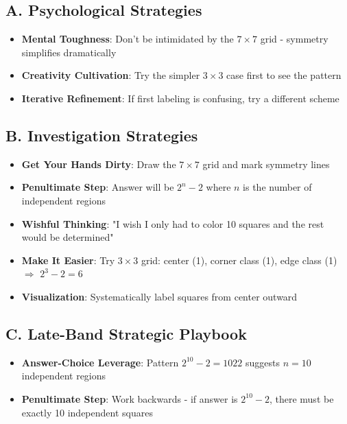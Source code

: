 \documentclass[]{article}
\begin{document}
\begin{strategicbox}
\subsection*{A. Psychological Strategies}
\begin{itemize}[leftmargin=*]
    \item \textbf{Mental Toughness}: Don't be intimidated by the $7 \times 7$ grid - symmetry simplifies dramatically
    \item \textbf{Creativity Cultivation}: Try the simpler $3 \times 3$ case first to see the pattern
    \item \textbf{Iterative Refinement}: If first labeling is confusing, try a different scheme
\end{itemize}

\subsection*{B. Investigation Strategies}
\begin{itemize}[leftmargin=*]
    \item \textbf{Get Your Hands Dirty}: Draw the $7 \times 7$ grid and mark symmetry lines
    \item \textbf{Penultimate Step}: Answer will be $2^n - 2$ where $n$ is the number of independent regions
    \item \textbf{Wishful Thinking}: "I wish I only had to color 10 squares and the rest would be determined"
    \item \textbf{Make It Easier}: Try $3 \times 3$ grid: center (1), corner class (1), edge class (1) $\Rightarrow$ $2^3 - 2 = 6$
    \item \textbf{Visualization}: Systematically label squares from center outward
\end{itemize}

\subsection*{C. Late-Band Strategic Playbook}
\begin{itemize}[leftmargin=*]
    \item \textbf{Answer-Choice Leverage}: Pattern $2^{10} - 2 = 1022$ suggests $n = 10$ independent regions
    \item \textbf{Penultimate Step}: Work backwards - if answer is $2^{10} - 2$, there must be exactly 10 independent squares
\end{itemize}


\end{strategicbox}
\end{document}
